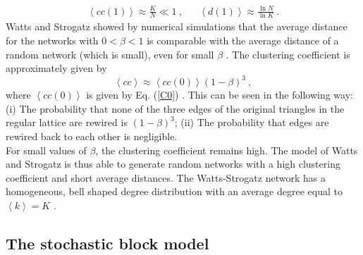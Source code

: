 \documentclass[11 pt , letterpaper , twoside , openright]{book}
\begin{document}
\begin{align}
	\left<cc(1)\right> \approx \frac{K}{N} \ll 1 \ , && \left<d(1)\right> \approx \frac{\ln{N}}{\ln{K}} \ .
\end{align}
Watts and Strogatz showed by numerical simulations that the average distance for the networks with $0 < \beta < 1$ is comparable with the average distance of a random network (which is small), even for small $\beta$ \cite{Newman2000}. The clustering coefficient is approximately given by
\begin{equation}
	\left<cc\right> \approx \left<cc(0)\right>(1-\beta)^3 \ ,
\end{equation} 
where $\left<cc(0)\right>$ is given by Eq. (\ref{C0}) \cite{Barrat1999}. This can be seen in the following way: (i) The probability that none of the three edges of the original triangles in the regular lattice are rewired is $(1-\beta)^3$; (ii) The probability that edges are rewired back to each other is negligible.\\
\newline
For small values of $\beta$, the clustering coefficient remains high. The model of Watts and Strogatz is thus able to generate random networks with a high clustering coefficient and short average distances. The Watts-Strogatz network has a homogeneous, bell shaped degree distribution with an average degree equal to $\left<k\right> = K$ \cite{Barrat1999}.

\subsection{The stochastic block model}
\end{document}
